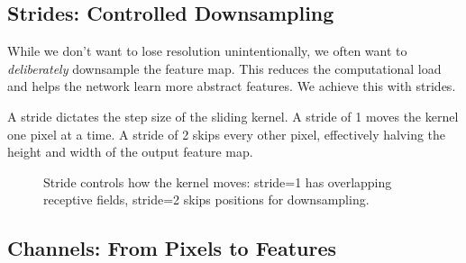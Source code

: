 \documentclass{article}
\begin{document}
\subsection{Strides: Controlled Downsampling}

While we don't want to lose resolution unintentionally, we often want to \textit{deliberately} downsample the feature map. This reduces the computational load and helps the network learn more abstract features. We achieve this with strides.

A stride dictates the step size of the sliding kernel. A stride of 1 moves the kernel one pixel at a time. A stride of 2 skips every other pixel, effectively halving the height and width of the output feature map.

\begin{figure}[h]
\centering
{}
\caption{Stride controls how the kernel moves: stride=1 has overlapping receptive fields, stride=2 skips positions for downsampling.}
\end{figure}


\subsection{Channels: From Pixels to Features}
\end{document}
